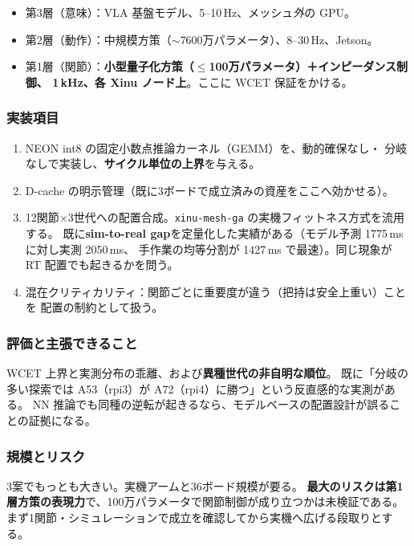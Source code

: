 \documentclass[11pt,a4paper]{article}
\newcommand{\code}[1]{\texttt{#1}}
\newcommand{\prob}[1]{\textbf{\textcolor{red!55!black}{#1}}}
\newcommand{\keyp}[1]{\textbf{\textcolor{blue!45!black}{#1}}}
\begin{document}
\begin{itemize}[leftmargin=1.4em,itemsep=2pt]
  \item 第3層（意味）：VLA 基盤モデル、5--10\,Hz、メッシュ\emph{外}の GPU。
  \item 第2層（動作）：中規模方策（$\sim$7600万パラメータ）、8--30\,Hz、Jetson。
  \item 第1層（関節）：\keyp{小型量子化方策（$\le$100万パラメータ）＋インピーダンス制御、
        1\,kHz、各 Xinu ノード上}。ここに WCET 保証をかける。
\end{itemize}

\subsubsection*{実装項目}

\begin{enumerate}[leftmargin=1.6em,itemsep=2pt]
  \item NEON int8 の固定小数点推論カーネル（GEMM）を、動的確保なし・
        分岐なしで実装し、\keyp{サイクル単位の上界}を与える。
  \item D-cache の明示管理（既に3ボードで成立済みの資産をここへ効かせる）。
  \item 12関節×3世代への配置合成。\code{xinu-mesh-ga} の実機フィットネス方式を流用する。
        既に\keyp{sim-to-real gap}を定量化した実績がある（モデル予測 1775\,ms に対し実測 2050\,ms、
        手作業の均等分割が 1427\,ms で最速）。同じ現象が RT 配置でも起きるかを問う。
  \item 混在クリティカリティ：関節ごとに重要度が違う（把持は安全上重い）ことを
        配置の制約として扱う。
\end{enumerate}

\subsubsection*{評価と主張できること}

WCET 上界と実測分布の乖離、および\keyp{異種世代の非自明な順位}。
既に「分岐の多い探索では A53（rpi3）が A72（rpi4）に勝つ」という反直感的な実測がある。
NN 推論でも同種の逆転が起きるなら、モデルベースの配置設計が誤ることの証拠になる。

\subsubsection*{規模とリスク}

3案でもっとも大きい。実機アームと36ボード規模が要る。
\prob{最大のリスクは第1層方策の表現力}で、100万パラメータで関節制御が成り立つかは未検証である。
まず1関節・シミュレーションで成立を確認してから実機へ広げる段取りとする。
\end{document}
